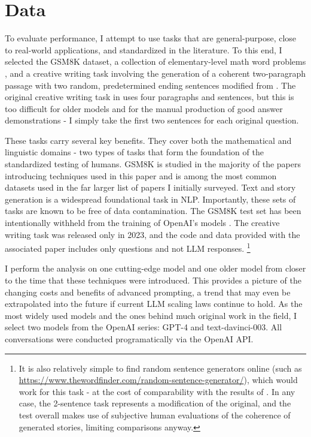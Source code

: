 \documentclass[11pt]{article}
\begin{document}
\section*{Data}

To evaluate performance, I attempt to use tasks that are general-purpose, close to real-world applications, and standardized in the literature. To this end, I selected the GSM8K dataset, a collection of elementary-level math word problems \cite{cobbe_training_2021}, and a creative writing task involving the generation of a coherent two-paragraph passage with two random, predetermined ending sentences modified from \citealp{yao_tree_2023}. The original creative writing task in \citealp{yao_tree_2023} uses four paragraphs and sentences, but this is too difficult for older models and for the manual production of good answer demonstrations - I simply take the first two sentences for each original question. 

These tasks carry several key benefits. They cover both the mathematical and linguistic domains - two types of tasks that form the foundation of the standardized testing of humans. GSM8K is studied in the majority of the papers introducing techniques used in this paper and is among the most common datasets used in the far larger list of papers I initially surveyed. Text and story generation is a widespread foundational task in NLP. Importantly, these sets of tasks are known to be free of data contamination. The GSM8K test set has been intentionally withheld from the training of OpenAI's models \cite{openai_gpt-4_2023}. The creative writing task was released only in 2023, and the code and data provided with the associated paper includes only questions and not LLM responses. \footnote{It is also relatively simple to find random sentence generators online (such as \url{https://www.thewordfinder.com/random-sentence-generator/}), which would work for this task - at the cost of comparability with the results of \cite{yao_tree_2023}. In any case, the 2-sentence task represents a modification of the original, and the test overall makes use of subjective human evaluations of the coherence of generated stories, limiting comparisons anyway.}

I perform the analysis on one cutting-edge model and one older model from closer to the time that these techniques were introduced. This provides a picture of the changing costs and benefits of advanced prompting, a trend that may even be extrapolated into the future if current LLM scaling laws continue to hold. As the most widely used models and the ones behind much original work in the field, I select two models from the OpenAI series: GPT-4 and text-davinci-003. All conversations were conducted programatically via the OpenAI API.
\end{document}
